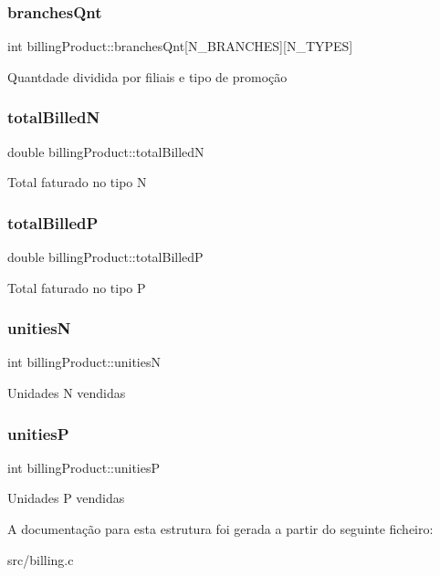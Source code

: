 \subsubsection{\texorpdfstring{branches\+Qnt}{branchesQnt}}
{\footnotesize\ttfamily int billing\+Product\+::branches\+Qnt\mbox{[}N\+\_\+\+B\+R\+A\+N\+C\+H\+ES\mbox{]}\mbox{[}N\+\_\+\+T\+Y\+P\+ES\mbox{]}}

Quantdade dividida por filiais e tipo de promoção \mbox{\label{structbillingProduct_acb86d5aba398d1b834ee2adfc957f6cb}} 
\subsubsection{\texorpdfstring{total\+BilledN}{totalBilledN}}
{\footnotesize\ttfamily double billing\+Product\+::total\+BilledN}

Total faturado no tipo N \mbox{\label{structbillingProduct_af5cc9c4ecd38c9d8fb97a2bc0be7eeb9}} 
\subsubsection{\texorpdfstring{total\+BilledP}{totalBilledP}}
{\footnotesize\ttfamily double billing\+Product\+::total\+BilledP}

Total faturado no tipo P \mbox{\label{structbillingProduct_aab2111c1f700bf508b4c691859d17eea}} 
\subsubsection{\texorpdfstring{unitiesN}{unitiesN}}
{\footnotesize\ttfamily int billing\+Product\+::unitiesN}

Unidades N vendidas \mbox{\label{structbillingProduct_ac75726314819281a39887d12ace96476}} 
\subsubsection{\texorpdfstring{unitiesP}{unitiesP}}
{\footnotesize\ttfamily int billing\+Product\+::unitiesP}

Unidades P vendidas 

A documentação para esta estrutura foi gerada a partir do seguinte ficheiro\+:\begin{DoxyCompactItemize}
\item 
src/billing.\+c\end{DoxyCompactItemize}
